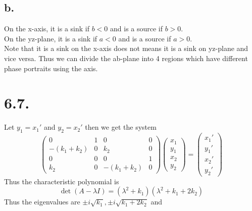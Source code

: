 \documentclass[11pt]{article}
\theoremstyle{mystyle}
\theoremstyle{definition}
\begin{document}
\subsection*{b.}
On the x-axis, it is a sink if $b < 0$ and is a source if $b>0$.  \\
On the yz-plane, it is a sink if $a <0$ and is a source if $a > 0$. \\
Note that it is a sink on the x-axis does not means it is a sink on yz-plane and vice versa. Thus we can divide the ab-plane into 4 regions which have different phase portraits using the axis. 
\clearpage
\section*{6.7.}
Let $y_1 = x_1'$ and $y_2 = x_2'$ then we get the system 
\[
  \begin{pmatrix}
    0 & 1 & 0 & 0\\
    -(k_1 + k_2) & 0 & k_2 & 0\\
    0 & 0 & 0 & 1 \\
    k_2 & 0 & -(k_1 + k_2) & 0
  \end{pmatrix}
  \begin{pmatrix}
    x_1 \\
    y_1 \\
    x_2 \\
    y_2
  \end{pmatrix}
  = 
  \begin{pmatrix}
    x_1' \\
    y_1' \\
    x_2' \\
    y_2'
  \end{pmatrix} 
\]
Thus the characteristic polynomial is 
\[
  \det(A - \lambda I) = (\lambda^2+k_1)(\lambda^2 + k_1+2k_2) 
\]
Thus the eigenvalues are $\pm i\sqrt{k_1}, \pm i\sqrt{k_1 + 2k_2}$ and 
\end{document}
